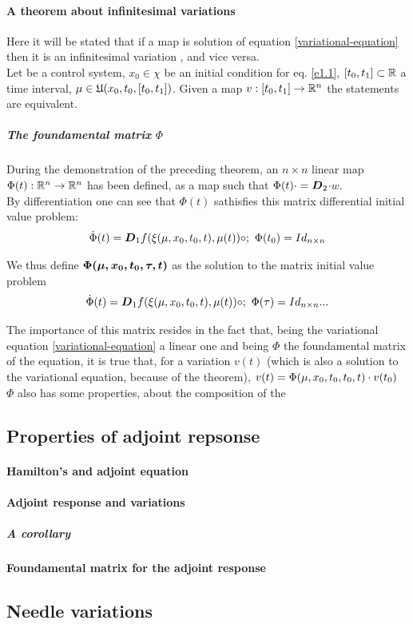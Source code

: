 \paragraph{A theorem about infinitesimal variations} 
Here it will be stated that if a map is solution of equation \ref{variational-equation} then it is an infinitesimal variation , and vice versa.\\
Let \controlSystem be a control system, $x_0\in\chi$ be an initial condition for eq. \ref{e1.1}, $[t_0,t_1]\subset\mathbb{R}$ a time interval, $\mu\in\mathfrak{U}(x_0,t_0,[t_0,t_1])$. Given a map $v:[t_0,t_1]\rightarrow\mathbb{R}^n$ the statements 
are equivalent. 

\subparagraph{The foundamental matrix $\Phi$} During the demonstration of the preceding theorem, an $n\times n$ linear map $\Phi(t):\mathbb{R}^n\rightarrow\mathbb{R}^n$ has been defined, as a map such that $\Phi(t)\cdot=\boldsymbol{D}_{2}$$\cdot w$. \\
By differentiation one can see that $\Phi(t)$ sathisfies this matrix differential initial value problem:
\begin{gather*}
\dot{\Phi}(t)=\boldsymbol{D}_{1}f(\xi(\mu,x_0,t_0,t),\mu(t))\circ;\text{   	   }\Phi(t_0)=Id_{n\times n} 
\end{gather*}

We thus define $\boldsymbol{\Phi(\mu,x_0,t_0,\tau,t)} $ as the solution to the matrix initial value problem 
\begin{equation*}
	\dot{\Phi}(t)=\boldsymbol{D}_{1}f(\xi(\mu,x_0,t_0,t),\mu(t))\circ;\text{   	   }\Phi(\tau)=Id_{n\times n} ...
\end{equation*}

The importance of this matrix resides in the fact that, being the variational equation \ref{variational-equation} a linear one and being $\Phi$ the foundamental matrix of the equation, it is true that, for a variation $v(t)$ (which is also a solution to the variational equation, because of the theorem), $v(t)=\Phi(\mu,x_0,t_0,t_0,t)\cdot v(t_0)$\\
$\Phi$ also has some properties, about the composition of the 

\subsection{Properties of adjoint repsonse }
\paragraph[prop 4.4]{Hamilton's and adjoint equation}
\paragraph[prop 4.5]{Adjoint response and variations}
\subparagraph[4.6]{A corollary}
\paragraph[prop 4.7]{Foundamental matrix for the adjoint response}
\subsection{Needle variations}